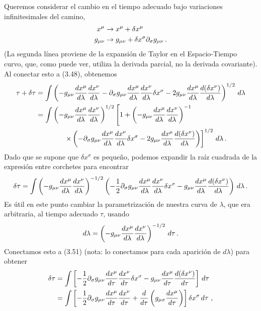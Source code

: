 \documentclass[11pt,b5paper,openany,twoside]{book}
\newcommand{\mn}{{\mu\nu}}
\newcommand{\p}[1]{{\partial_{#1}}}
\begin{document}
Queremos considerar el cambio en el tiempo adecuado bajo variaciones infinitesimales del camino,
\begin{align}
x^\mu &\rightarrow x^\mu+\delta x^\mu \notag \\
g_\mn &\rightarrow g_\mn + \delta x^\sigma\partial_\sigma g_\mn
\,. \label{3.49}
\end{align}
(La segunda línea proviene de la expansión de Taylor en el Espacio-Tiempo curvo, que, como puede ver, utiliza la derivada parcial, no la derivada covariante).
Al conectar esto a (3.48), obtenemos
\begin{align}
\tau + \delta\tau &=  \int\left(-g_\mn {{dx^\mu}\over{d\lambda}}
{{dx^\nu}\over{d\lambda}} - \p\sigma g_\mn {{dx^\mu}\over{d\lambda}}
{{dx^\nu}\over{d\lambda}}\delta x^\sigma
-2 g_\mn {{dx^\mu}\over{d\lambda}}{{d(\delta x^\nu)}\over{d\lambda}}
\right)^{1/2}\, d\lambda \notag \\
&=  \int\left(-g_\mn {{dx^\mu}\over{d\lambda}}
{{dx^\nu}\over{d\lambda}}\right)^{1/2}
\left[1+\left(-g_\mn {{dx^\mu}\over{d\lambda}}
{{dx^\nu}\over{d\lambda}}\right)^{-1}\right. \notag \\
& \qquad\qquad\left.
\times\left(-\p\sigma g_\mn {{dx^\mu}\over{d\lambda}}
{{dx^\nu}\over{d\lambda}}\delta x^\sigma
-2 g_\mn {{dx^\mu}\over{d\lambda}}{{d(\delta x^\nu)}\over{d\lambda}}
\right)\right]^{1/2}\, d\lambda\,. \label{3.50}
\end{align}
Dado que se supone que $\delta x^\sigma$ es pequeño, podemos expandir la raíz cuadrada de la expresión entre corchetes para encontrar
\begin{equation}
\delta\tau = \int\left(-g_\mn {{dx^\mu}\over{d\lambda}}
{{dx^\nu}\over{d\lambda}}\right)^{-1/2}
\left(-{1\over 2}\p\sigma g_\mn {{dx^\mu}\over{d\lambda}}
{{dx^\nu}\over{d\lambda}}\delta x^\sigma
- g_\mn {{dx^\mu}\over{d\lambda}}{{d(\delta x^\nu)}\over{d\lambda}}
\right)\, d\lambda\,.\label{3.51}
\end{equation}
Es útil en este punto cambiar la parametrización de nuestra curva de $\lambda$, que era arbitraria, al tiempo adecuado $\tau$, usando
\begin{equation}
d\lambda = \left(-g_\mn {{dx^\mu}\over{d\lambda}}
{{dx^\nu}\over{d\lambda}}\right)^{-1/2}\, d\tau\,.\label{3.52}
\end{equation}
Conectamos esto a (3.51) (nota: lo conectamos para cada aparición de $d\lambda$) para obtener
\begin{align}
\delta\tau &= \int \left[-{1\over 2}\p\sigma g_\mn
{{dx^\mu}\over{d\tau}} {{dx^\nu}\over{d\tau}}\delta x^\sigma
- g_\mn {{dx^\mu}\over{d\tau}}{{d(\delta x^\nu)}\over{d\tau}}
\right]\, d\tau \notag \\
&=  \int \left[-{1\over 2}\p\sigma g_\mn
{{dx^\mu}\over{d\tau}} {{dx^\nu}\over{d\tau}}
+{{d}\over{d\tau}}\left(g_{\mu\sigma} {{dx^\mu}\over{d\tau}}\right)
\right]\delta x^\sigma\, d\tau\ , \label{3.53}
\end{align}
\end{document}
